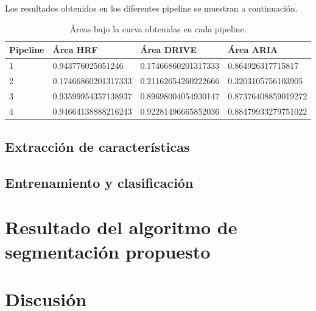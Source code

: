 Los resultados obtenidos en los diferentes pipeline se muestran a continuaci\'on.


\begin{table}[H]
\begin{center}
\begin{tabular}{|l|l|l|l|}
\hline
Pipeline & \'Area HRF & \'Area DRIVE & \'Area ARIA \\
\hline \hline
1 & 0.943776025051246 & 0.17466860201317333 & 0.864926317715817 \\ \hline
2 & 0.17466860201317333 & 0.21162654260222666 & 0.3203105756103905 \\ \hline
3 & 0.93599954357138937 & 0.89698004054930147 & 0.87376408859019272 \\ \hline
4 & 0.94664138888216243 & 0.92281496665852036 & 0.88479933279751022 \\ \hline
\end{tabular}
\caption{\'Areas bajo la curva obtenidas en cada pipeline.}
\label{tabla:sencilla}
\end{center}
\end{table}
 


\subsection{Extracci\'on de caracter\'isticas}



\subsection{Entrenamiento y clasificaci\'on}

\section{Resultado del algoritmo de segmentaci\'on propuesto}

\section{Discusi\'on}

